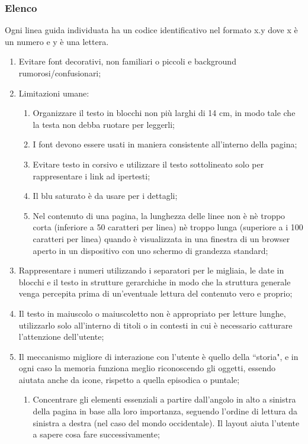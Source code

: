 \subsubsection{Elenco}
Ogni linea guida individuata ha un codice identificativo nel formato x.y dove x è un numero e y è una lettera.
\begin{enumerate}
    \item Evitare font decorativi, non familiari o piccoli e background rumorosi/confusionari; \label{lg:1}
    \item Limitazioni umane:\label{lg:2} 
    \begin{enumerate}[label=\alph*.]
        \item Organizzare il testo in blocchi non più larghi di 14 cm, in modo tale che la testa non debba ruotare per leggerli;
        \item I font devono essere usati in maniera consistente all'interno della pagina;
        \item Evitare testo in corsivo e utilizzare il testo sottolineato solo per rappresentare i link ad ipertesti;\label{lg:2.c}
        \item Il blu saturato è da usare per i dettagli;
        \item Nel contenuto di una pagina, la lunghezza delle linee non è nè troppo corta (inferiore a 50 caratteri per linea) nè troppo lunga (superiore a i 100 caratteri per linea) quando è visualizzata in una finestra di un browser aperto in un dispositivo con uno schermo di grandezza standard;\label{lg:2.e}
    \end{enumerate}
    \item Rappresentare i numeri utilizzando i separatori per le migliaia, le date in blocchi e il testo in strutture gerarchiche in modo che la struttura generale venga percepita prima di un'eventuale lettura del contenuto vero e proprio;\label{lg:3}
    \item Il testo in maiuscolo o maiuscoletto non è appropriato per letture lunghe, utilizzarlo solo all'interno di titoli o in contesti in cui è necessario catturare l'attenzione dell'utente;\label{lg:4}
    \item Il meccanismo migliore di interazione con l'utente è quello della ``storia", e in ogni caso la memoria funziona meglio riconoscendo gli oggetti, essendo aiutata anche da icone, rispetto a quella episodica o puntale;\label{lg:5}
    \begin{enumerate}[label=\alph*.]
        \item Concentrare gli elementi essenziali a partire dall'angolo in alto a sinistra della pagina in base alla loro importanza, seguendo l'ordine di lettura da sinistra a destra (nel caso del mondo occidentale). Il layout aiuta l'utente a sapere cosa fare successivamente;

\end{enumerate}
\end{enumerate}
